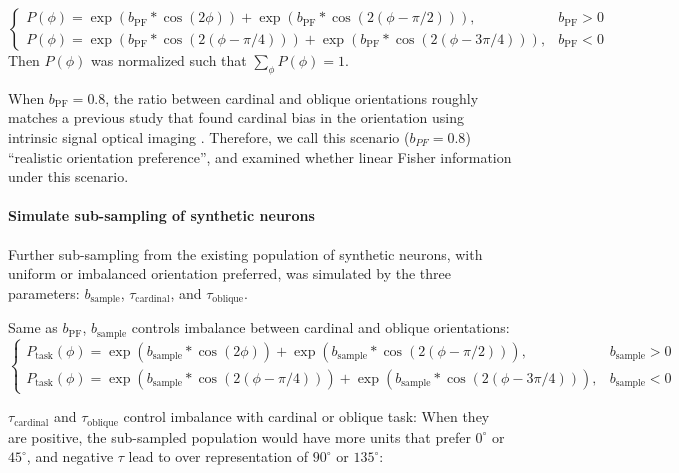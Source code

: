 \documentclass[lineno,pdflatex,sn-basic]{sn-jnl}%
\theoremstyle{thmstyleone}%
\theoremstyle{thmstyletwo}%
\theoremstyle{thmstylethree}%
\begin{document}
\[
\begin{cases}
P(\phi) = \operatorname{exp}(b_\textrm{PF} *  \operatorname{cos}(2\phi)) + \operatorname{exp}(b_\textrm{PF} * \operatorname{cos}(2(\phi - \pi/2))),& b_\textrm{PF} > 0 \\
 P(\phi) = \operatorname{exp}(b_\textrm{PF} *  \operatorname{cos}(2(\phi - \pi/4))) + \operatorname{exp}(b_\textrm{PF} *  \operatorname{cos}(2(\phi - 3\pi/4))), & b_\textrm{PF} < 0
\end{cases}
\]
Then $P(\phi)$ was normalized such that $\sum_{\phi}P(\phi) = 1$.

When $b_\textrm{PF} = 0.8$, the ratio between cardinal and oblique orientations roughly matches a previous study that found cardinal bias in the orientation using intrinsic signal optical imaging \citep{fang2022orientation}. Therefore, we call this scenario ($b_{PF} = 0.8$) ``realistic orientation preference'', and examined whether linear Fisher information under this scenario. 

\paragraph{Simulate sub-sampling of synthetic neurons}  \label{sec_ch2:simulate_subsampling}
Further sub-sampling from the existing population of synthetic neurons, with uniform or imbalanced orientation preferred, was simulated by the three parameters: $b_\textrm{sample}$, $\tau_\textrm{cardinal}$, and $\tau_\textrm{oblique}$.

Same as $b_\textrm{PF}$, $b_\textrm{sample}$ controls imbalance between cardinal and oblique orientations:
\[
\begin{cases}
 P_\textrm{task}(\phi) = \operatorname{exp}(b_\textrm{sample} *  \operatorname{cos}(2\phi)) + \operatorname{exp}(b_\textrm{sample} *  \operatorname{cos}(2(\phi - \pi/2))), & b_\textrm{sample} > 0 \\
 P_\textrm{task}(\phi) = \operatorname{exp}(b_\textrm{sample} *  \operatorname{cos}(2(\phi - \pi/4))) + \operatorname{exp}(b_\textrm{sample} *  \operatorname{cos}(2(\phi - 3\pi/4))), & b_\textrm{sample} < 0
\end{cases}
\]


$\tau_\textrm{cardinal}$ and $\tau_\textrm{oblique}$ control imbalance with cardinal or oblique task: When they are positive, the sub-sampled population would have more units that prefer $0^\circ$ or $45^\circ$, and negative $\tau$ lead to over representation of $90^\circ$ or $135^\circ$:
\end{document}

